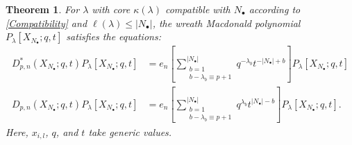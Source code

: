\documentclass{amsart}
\newcommand{\kb}{\kappa}
\newtheorem{thm}{Theorem}
\theoremstyle{remark}
\numberwithin{thm}{section}
\numberwithin{equation}{section}
\begin{document}
\begin{thm}
For $\lambda$ with core $\kb(\lambda)$ compatible with $N_\bullet$ according to \eqref{Compatibility} and $\ell(\lambda)\le|N_\bullet|$, the wreath Macdonald polynomial $P_\lambda[X_{N_\bullet};q,t]$ satisfies the equations:
\begin{align*}
D_{p,n}^*(X_{N_\bullet};q,t)P_\lambda[X_{N_\bullet};q,t] &= e_n\left[ \sum_{\substack{b=1\\ b-\lambda_b\equiv p+1}}^{|N_\bullet|}q^{-\lambda_b}t^{-|N_\bullet|+b} \right]
P_\lambda[X_{N_\bullet};q,t]\\
D_{p,n}(X_{N_\bullet};q,t)P_\lambda[X_{N_\bullet};q,t] &= e_n\left[ \sum_{\substack{b=1\\ b-\lambda_b\equiv p+1}}^{|N_\bullet|}q^{\lambda_b}t^{|N_\bullet|-b} \right]
P_\lambda[X_{N_\bullet};q,t].
\end{align*}
Here, $x_{i,l}$, $q$, and $t$ take generic values.
\label{ThmEigenHigher}
\end{thm}
\end{document}
